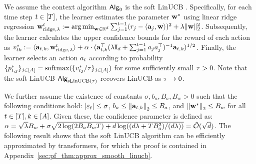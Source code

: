 We assume the context algorithm ${\mathsf{Alg}}_0$ is the soft LinUCB \citep{chu2011contextual}. Specifically, for each time step $t\in[{T}]$, the learner estimates the parameter ${{\mathbf w}^*}$ using linear ridge regression ${\mathbf w}^t_{{\rm ridge},\lambda}:=\operatorname*{arg\,min}_{{\mathbf w}\in\mathbb{R}^d} \sum_{j=1}^{t-1}({r}_j-\left\langle{\mathbf a}_j,{\mathbf w}\right\rangle)^2+ \lambda \|{\mathbf w}\|_2^2$. Subsequently, the learner calculates the upper confidence bounds for the reward of each action as $v^*_{tk}:=\langle {\mathbf a}_{t,k},{\mathbf w}^t_{{\rm ridge},\lambda}\rangle +{\alpha} \cdot ({\mathbf a}_{t,k}^\top (\lambda{\mathbf I}_d+\sum_{j=1}^{t-1}{a}_j{a}_j^\top)^{-1}  {\mathbf a}_{t,k})^{1/2}$. Finally, the learner selects an action ${a}_t$ according to probability $\{ p^*_{t,j} \}_{j \in [{A}]} = {\rm softmax}(\{v^*_{tj}/{\tau} \}_{j \in [{A}]})$ for some sufficiently small ${\tau}>0$. Note that the soft LinUCB ${\mathsf{Alg}}_{{\mathrm{sLinUCB}}({\tau})}$ recovers LinUCB as ${\tau}\to 0$. 


We further assume the existence of constants $\sigma,b_a,B_a,B_w>0$ such that the following conditions hold:   $|{\varepsilon}_t|\leq\sigma$, $b_a\leq\left\|{{\mathbf a}_{t,k}}\right\|_2\leq B_a$, and $\left\|{{\mathbf w}^*}\right\|_2\le B_w$ for all $t\in[{T}],k\in[{A}]$. Given these, the confidence parameter is defined as: ${\alpha}=\sqrt{\lambda}B_w+\sigma\sqrt{2\log (2B_aB_w {T} )+d\log((d\lambda+{T} B_a^2)/(d\lambda))} = {\tilde{\mathcal O}}(\sqrt{d})$. The following result shows that the soft LinUCB algorithm can be efficiently approximated by transformers, for which the proof is contained in Appendix~\ref{sec:pf_thm:approx_smooth_linucb}. 

